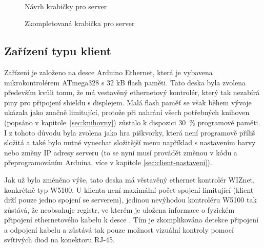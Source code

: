 \begin{figure}[hbtp]
\begin{minipage}[c]{\textwidth/2-.7cm}
\end{minipage}
\\
\begin{minipage}[c]{\textwidth/2-0.5cm}
\caption{\label{fig:server_navrh}Návrh krabičky pro server}
\end{minipage}
\begin{minipage}[c]{\textwidth/2-.5cm}
\caption{\label{fig:server_realizace}Zkompletovaná krabička pro server}
\end{minipage}
\end{figure}





\subsection{Zařízení typu klient}
\label{sec:HWclient}
Zařízení je založeno na desce Arduino Ethernet, která je vybavena mikrokontrolérem ATmega328 s 32 kB flash paměti. Tato deska byla zvolena především kvůli tomu, že má vestavěný ethernetový kontrolér, který tak nezabírá piny pro připojení shieldu s displejem. Malá flash paměť se však během vývoje ukázala jako značně limitující, protože při nahrání všech potřebných knihoven (popsáno v kapitole~\ref{sec:knihovny}) zůstalo k dispozici 30~\% programové paměti. I z tohoto důvodu byla zvolena jako hra piškvorky, která není programově příliš složitá a také bylo nutné vynechat složitější menu například s nastavením barvy nebo změny IP adresy serveru (to se nyní musí provádět změnou v kódu a přeprogramováním Arduina, více v kapitole \ref{sec:client-nastaveni}).

Jak už bylo zméněno výše, tato deska má věstavěný ethernet kontrolér WIZnet, konkrétně typ W5100. U klienta není maximální počet spojení limitující (klient drží pouze jedno spojení se serverem), jedinou nevýhodou kontroléru W5100 tak zůstává, že neobsahuje registr, ve kterém je uložena informace o fyzickém připojení ethernetového kabelu k desce \cite{datasheet_w5100}. Tím je zkomplikována detekce připojení a odpojení kabelu a zůstává tak pouze možnost vizuální kontroly pomocí svítivých diod na konektoru RJ-45.

